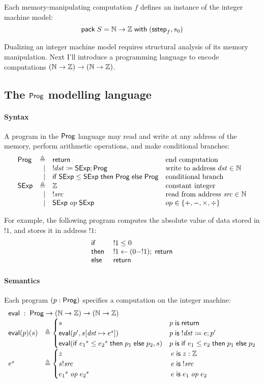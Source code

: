 Each memory-manipulating computation $f$ defines an instance of the integer
machine model:
\[\mathsf{pack}\;S=\mathbb N\to\mathbb Z\;\mathsf{with}\;(\mathsf{sstep}_f,s_0)\]

Dualizing an integer machine model requires structural analysis of its memory
manipulation.  Next I'll introduce a programming language to encode computations
$(\mathbb N\to\mathbb Z)\to(\mathbb N\to\mathbb Z)$.

\subsection{The $\mathsf{Prog}$ modelling language}
\label{sec:prog-lang}
\paragraph{Syntax}
A program in the $\mathsf{Prog}$ language may read and write at any address of the
memory, perform arithmetic operations, and make conditional branches:
\[\begin{array}{lrll}
\Prog&\triangleq&\Return&\text{end computation}\\
&\mid&!dst\coloneqq\Sexp;\Prog&\text{write to address }dst\in\Nat\\\null
&\mid&\If\Sexp\le\Sexp\Then\Prog\Else\Prog&\text{conditional branch}\\
\Sexp&\triangleq&\Int&\text{constant integer}\\
&\mid&!\src&\text{read from address }\src\in\Nat\\
&\mid&\Sexp\oop\Sexp&op\in\{+,-,\times,\div\}
\end{array}\]

For example, the following program computes the absolute value of data stored in
$!1$, and stores it in address $!1$:
\[\begin{array}{ll}
  \mathsf{if}\;&!1\le0\\
  \mathsf{then}\;&!1\gets(0-!1);\;\mathsf{return}\\
  \mathsf{else}\;&\mathsf{return}
\end{array}\]

\paragraph{Semantics}
Each program $(p:\mathsf{Prog})$ specifies a computation on the integer machine:
\[\begin{array}{ll}
\multicolumn{2}{l}{\Eval\;:\;\Prog\to(\Nat\to\Int)\to(\Nat\to\Int)}\\
\Eval(p)(s)&\triangleq
\begin{cases}
  s&p\Is\Return\\
  \Eval(p',\update{s}{\dst}{e^s})&p\Is !\dst\coloneqq e;p'\\
  \Eval(\If {e_1}^s\le{e_2}^s\Then p_1\Else p_2,s)&p\Is\If e_1\le e_2\Then p_1\Else p_2
\end{cases}\\
e^s&\triangleq
\begin{cases}
  z\hphantom{\Exec(\If {e_1}^s\le{e_2}^s\Then p_1\Else p_2,)}&e\Is z:\Int\\
  s!\src&e\Is !\src\\
  {e_1}^s\oop{e_2}^s&e\Is e_1\oop e_2
\end{cases}
\end{array}\]

